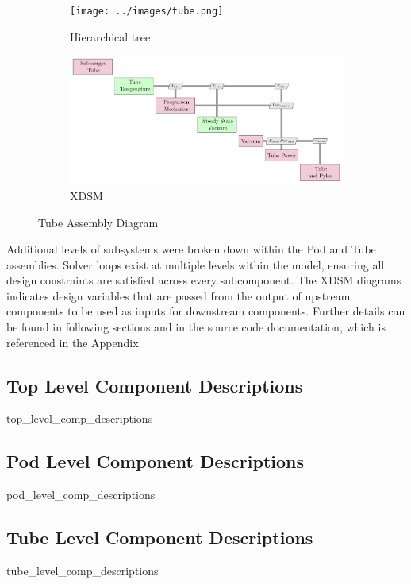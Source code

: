 \begin{figure}
\centering
\begin{subfigure}[t]{.5\textwidth}
  \centering
  \texttt{[image: ../images/tube.png]}
  \caption{Hierarchical tree}
  \label{fig:tree:tube}
\end{subfigure}%
\begin{subfigure}[t]{.5\textwidth}
  \centering
  \includegraphics{../images/xdsm/tube.pdf}
  \caption{XDSM}
  \label{fig:xdsm:tube}
\end{subfigure}
\caption{Tube Assembly Diagram}
\label{fig:tube}
\end{figure}


Additional levels of subsystems were broken down within the Pod and Tube assemblies.
Solver loops exist at multiple levels within the model, ensuring all design
constraints are satisfied across every subcomponent.
The XDSM diagrams indicates design variables that are passed from the output of
upstream components to be used as inputs for downstream components.
Further details can be found in following sections and in the source code
documentation, which is referenced in the Appendix.

\subsection{Top Level Component Descriptions}
	{top_level_comp_descriptions}
\subsection{Pod Level Component Descriptions}
	{pod_level_comp_descriptions}
\subsection{Tube Level Component Descriptions}
	{tube_level_comp_descriptions}


